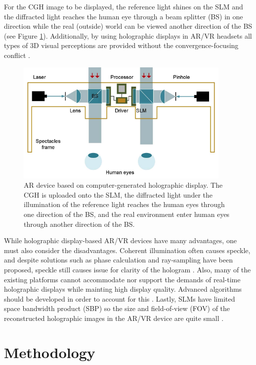 \documentclass[12pt]{article}
\begin{document}
For the CGH image to be displayed, the reference light shines on the SLM and the diffracted light reaches the human eye through a beam splitter (BS) in one direction while the real (outside) world can be viewed another direction of the BS \cite{he2019progress} (see Figure \ref{fig:14}).
Additionally, by using holographic displays in AR/VR headsets all types of 3D visual perceptions are provided without the convergence-focusing conflict \cite{he2019progress}.

\begin{figure}[H]
    \centering
    \includegraphics[width=.7\textwidth]{holo vrar.png}
    \caption{\centering AR device based on computer-generated holographic display. The CGH is uploaded onto the SLM, the diffracted light under the illumination of the reference light reaches
    the human eyes through one direction of the BS, and the real environment enter human eyes through another direction of the BS. \protect\cite{he2019progress}}
    \label{fig:14}
\end{figure}

While holographic display-based AR/VR devices have many advantages, one must also consider the disadvantages. Coherent illumination often causes speckle, and despite solutions such as phase calculation and ray-sampling have been proposed, speckle still causes issue for clarity of the hologram \cite{he2019progress}.
Also, many of the existing platforms cannot accommodate nor support the demands of real-time holographic displays while mainting high display quality. Advanced algorithms should be developed in order to account for this \cite{he2019progress}.
Lastly, SLMs have limited space bandwidth product (SBP) so the size and field-of-view (FOV) of the reconstructed holographic images in the AR/VR device are quite small \cite{he2019progress}.

\newpage

\section{Methodology} \label{sec:2}
\end{document}
